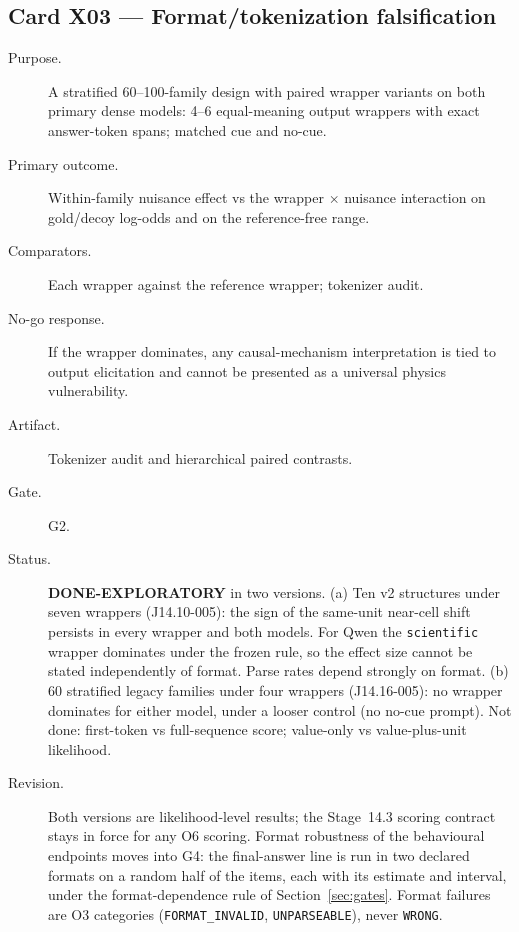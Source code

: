 \documentclass[10pt,a4paper]{article}
\begin{document}
\subsection{Card X03 --- Format/tokenization falsification}
\label{card:X03}
\begin{description}
\item[Purpose.] A stratified 60--100-family design with paired wrapper variants on both primary dense models:
4--6 equal-meaning output wrappers with exact answer-token spans; matched cue and no-cue.
\item[Primary outcome.] Within-family nuisance effect vs the wrapper $\times$ nuisance interaction on gold/decoy
log-odds and on the reference-free range.
\item[Comparators.] Each wrapper against the reference wrapper; tokenizer audit.
\item[No-go response.] If the wrapper dominates, any causal-mechanism interpretation is tied to output
elicitation and cannot be presented as a universal physics vulnerability.
\item[Artifact.] Tokenizer audit and hierarchical paired contrasts.
\item[Gate.] G2.
\item[Status.] \textbf{DONE-EXPLORATORY} in two versions. (a) Ten v2 structures under seven wrappers
(J14.10-005): the sign of the same-unit near-cell shift persists in every wrapper and both models. For Qwen the
\texttt{scientific} wrapper dominates under the frozen rule, so the effect size cannot be stated independently of
format. Parse rates depend strongly on format. (b) 60 stratified legacy families under four wrappers
(J14.16-005): no wrapper dominates for either model, under a looser control (no no-cue prompt). Not done:
first-token vs full-sequence score; value-only vs value-plus-unit likelihood.
\item[Revision.] Both versions are likelihood-level results; the Stage~14.3 scoring contract stays in force for
any O6 scoring. Format robustness of the behavioural endpoints moves into G4: the final-answer line is run in two
declared formats on a random half of the items, each with its estimate and interval, under the format-dependence
rule of Section~\ref{sec:gates}. Format
failures are O3 categories (\texttt{FORMAT\_INVALID}, \texttt{UNPARSEABLE}), never \texttt{WRONG}.
\end{description}

\end{document}
